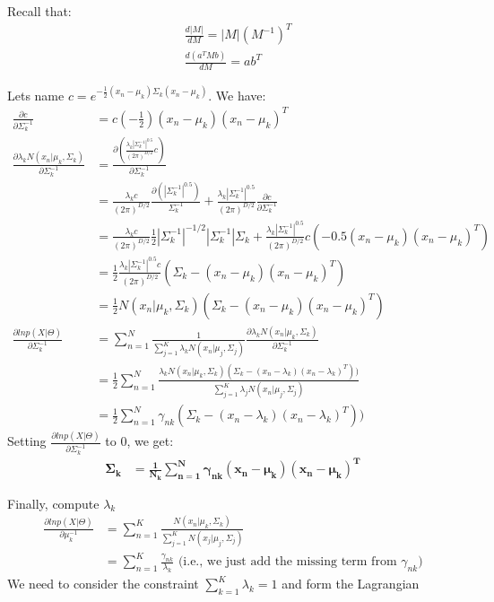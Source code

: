 \documentclass[11pt]{article}
\begin{document}
Recall that:
\begin{align*}
& \frac{d|M|}{dM} = |M|(M^{-1})^T \\
& \frac{d(a^TMb)}{dM} = ab^T
\end{align*}

Lets name $c=e^{-\frac{1}{2}(x_n-\mu_k)\Sigma_k(x_n-\mu_k)}$. We have:
\begin{align*}
\frac{\partial c}{\partial \Sigma^{-1}_k} &= c(-\frac{1}{2})(x_n - \mu_k)(x_n - \mu_k)^T \\
\frac{\partial \lambda_k N(x_n|\mu_k,\Sigma_k)}{\partial\Sigma_k^{-1}} &= \frac{\partial(\frac{\lambda_k|\Sigma_k^{-1}|^{0.5}}{(2 \pi)^{D/2}}c)}{\partial \Sigma^{-1}_k} \\
&= \frac{\lambda_k c}{(2 \pi)^{D/2}}\frac{\partial(|\Sigma_k^{-1}|^{0.5})}{\Sigma_k^{-1}}
+ \frac{\lambda_k |\Sigma_k^{-1}|^{0.5}}{(2 \pi)^{D/2}} \frac{\partial c}{\partial \Sigma_k^{-1}} \\
&=\frac{\lambda_k c}{(2 \pi)^{D/2}}\frac{1}{2}|\Sigma_k^{-1}|^{-1/2} |\Sigma_k^{-1}| \Sigma_k
+ \frac{\lambda_k |\Sigma_k^{-1}|^{0.5}}{(2 \pi)^{D/2}}c{(-0.5(x_n-\mu_k)(x_n-\mu_k)^T)}\\
&= \frac{1}{2} \frac{\lambda_k |\Sigma_k^{-1}|^{0.5}c}{(2 \pi)^{D/2}}(\Sigma_k - (x_n-\mu_k)(x_n-\mu_k)^T)\\
&= \frac{1}{2} N(x_n|\mu_k, \Sigma_k)(\Sigma_k - (x_n-\mu_k)(x_n-\mu_k)^T) \\
\frac{\partial ln p(X|\Theta)}{\partial \Sigma_k^{-1}} &= \sum_{n=1}^N
\frac{1}{\sum_{j=1}^K \lambda_k N(x_n|\mu_j,\Sigma_j)}
\frac{\partial \lambda_k N(x_n|\mu_k,\Sigma_k)}{\partial\Sigma_k^{-1}} \\
&= \frac{1}{2} \sum_{n=1}^N \frac{\lambda_k N(x_n|\mu_k,\Sigma_k)(\Sigma_k-(x_n-\lambda_k)(x_n-\lambda_k)^T))}{\sum_{j=1}^K \lambda_j N(x_n|\mu_j,\Sigma_j)}\\
&=\frac{1}{2}\sum_{n=1}^N\gamma_{nk}(\Sigma_k-(x_n-\lambda_k)(x_n-\lambda_k)^T))
\end{align*}
Setting $\frac{\partial ln p(X|\Theta)}{\partial \Sigma_k^{-1}}$ to 0, we get:
\begin{align*}
\bm{\Sigma _k} &= \bm{\frac{1}{N_k} \sum _{n=1}^N \gamma _{nk}(x_n-\mu _k)(x_n-\mu _k)^T}
\end{align*}

Finally, compute $\lambda_k$
\begin{align*}
\frac{\partial ln p(X|\Theta)}{\partial \mu_k^{-1}} &= \sum_{n=1}^K \frac{N(x_n|\mu_k,\Sigma_k)}{\sum_{j=1}^K N(x_j|\mu_j,\Sigma_j)} \\
&= \sum_{n=1}^K \frac{\gamma_{nk}}{\lambda_k} \text{~(i.e., we just add the missing term from~} \gamma_{nk})
\end{align*}
We need to consider the constraint $\sum_{k=1}^K \lambda_k=1$ and form the Lagrangian
\end{document}

